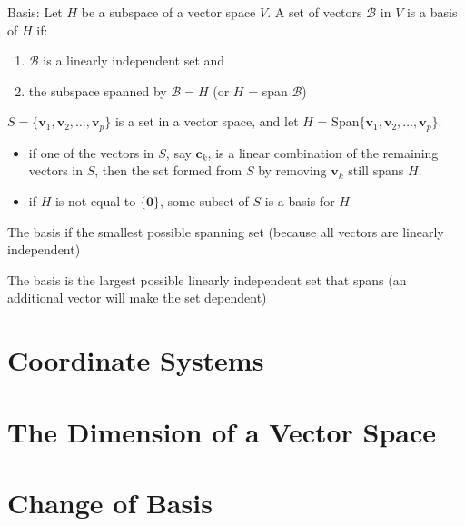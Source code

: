 \documentclass[../linalg.tex]{subfiles}
\begin{document}
Basis: Let $H$ be a subspace of a vector space $V$. A set of vectors $\mathcal{B}$ in $V$ is a basis of $H$ if:
\begin{enumerate}
    \item $\mathcal{B}$ is a linearly independent set and 
    \item the subspace spanned by $\mathcal{B}=H$ (or $H$ = span $\mathcal{B}$)
\end{enumerate}

\begin{theorem}
    $S=\{\textbf{v}_1,\textbf{v}_2,\dots,\textbf{v}_p\}$ is a set in a vector space, and let $H$ = Span$\{\textbf{v}_1,\textbf{v}_2,\dots,\textbf{v}_p\}$.
    \begin{itemize}
        \item if one of the vectors in $S$, say $\textbf{c}_k$, is a linear combination of the remaining vectors in $S$, then the set formed from $S$ by removing $\textbf{v}_k$ still spans $H$.
        \item if $H$ is not equal to $\{\textbf{0}\}$, some subset of $S$ is a basis for $H$
    \end{itemize}
\end{theorem}

The basis if the smallest possible spanning set (because all vectors are linearly independent)

The basis is the largest possible linearly independent set that spans (an additional vector will make the set dependent)

\section{Coordinate Systems}
\section{The Dimension of a Vector Space}
\section{Change of Basis}
\end{document}
